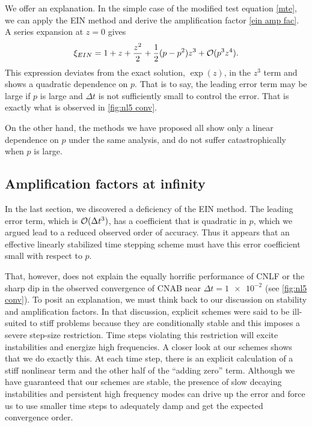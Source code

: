 We offer an explanation. In the simple case of the modified test equation \cref{mte}, we can apply the EIN method and derive the amplification factor \cref{ein amp fac}. A series expansion at $z=0$ gives 
\begin{align}
        \xi_{EIN}
= 1 + z + \frac{z^2}{2} + \frac{1}{2}(p-p^2)z^3 + \mathcal{O}(p^3z^4).
\end{align}
This expression deviates from the exact solution, $\exp(z)$, in the $z^3$ term  and shows a quadratic dependence on $p$. That is to say, the leading error term may be large if $p$ is large and $\Delta t$ is not sufficiently small to control the error. That is exactly what is observed in \cref{fig:nl5 conv}.

On the other hand, the methods we have proposed all show only a linear dependence on $p$ under the same analysis, and do not suffer catastrophically when $p$ is large.

\subsection{Amplification factors at infinity}
In the last section, we discovered a deficiency of the EIN method. The leading error term, which is $\mathcal{O}(\Delta t^3)$, has a coefficient that is quadratic in $p$, which we argued lead to a reduced observed order of accuracy. Thus it appears that an effective linearly stabilized time stepping scheme must have this error coefficient small with respect to $p$. 

That, however, does not explain the equally horrific performance of CNLF or the sharp dip in the observed convergence of CNAB  near $\Delta t = \num{1e-2}$ (see \cref{fig:nl5 conv}). To posit an explanation, we must think back to our discussion on stability and amplification factors. In that discussion, explicit schemes were said to be ill-suited to stiff problems because they are conditionally stable and this imposes a severe step-size restriction. Time steps violating this restriction will excite instabilities and energize high frequencies. A closer look at our schemes shows that we do exactly this. At each time step, there is an explicit calculation of a stiff nonlinear term and the other half of the ``adding zero'' term. Although we have guaranteed that our schemes are stable, the presence of slow decaying instabilities and persistent high frequency modes can drive up the error and force us to use smaller time steps to adequately damp and get the expected convergence order.

